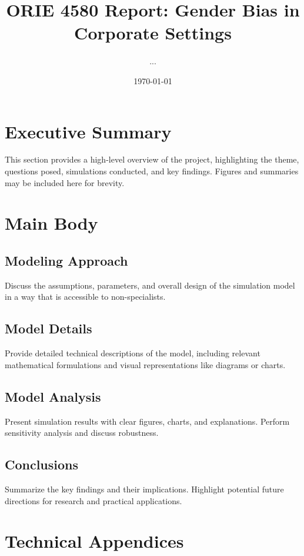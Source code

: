 \documentclass[12pt]{article}
\title{\textbf{ORIE 4580 Report: Gender Bias in Corporate Settings}}
\author{...}
\date{\today}
\begin{document}
\maketitle
\tableofcontents
\newpage

\section*{Executive Summary}

This section provides a high-level overview of the project, highlighting the theme, questions posed, simulations conducted, and key findings. 
Figures and summaries may be included here for brevity.

\newpage
\section{Main Body}

\subsection{Modeling Approach}
Discuss the assumptions, parameters, and overall design of the simulation model in a way that is accessible to non-specialists.

\subsection{Model Details}
Provide detailed technical descriptions of the model, including relevant mathematical formulations and visual representations like diagrams or charts.

\subsection{Model Analysis}
Present simulation results with clear figures, charts, and explanations. Perform sensitivity analysis and discuss robustness.

\subsection{Conclusions}
Summarize the key findings and their implications. Highlight potential future directions for research and practical applications.

\newpage
\appendix
\section{Technical Appendices}
\end{document}
